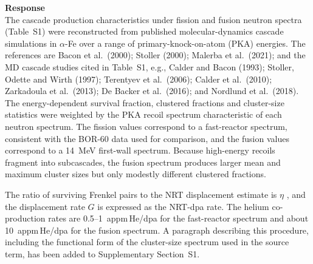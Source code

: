 \documentclass{article}
\newif\ifshowauthornotes
\newcommand{\authornote}[1]{\ifshowauthornotes{\color{red}\ [\textbf{Author action:} #1]}\fi}
\begin{document}
\begin{itemize}
\textbf{Response}\\
The cascade production characteristics under fission and fusion neutron spectra (Table~S1) were reconstructed from published molecular-dynamics cascade simulations in $\alpha$-Fe over a range of primary-knock-on-atom (PKA) energies. The references are Bacon et al.\ (2000); Stoller (2000); Malerba et al.\ (2021); and the MD cascade studies cited in Table~S1, e.g., Calder and Bacon (1993); Stoller, Odette and Wirth (1997); Terentyev et al.\ (2006); Calder et al.\ (2010); Zarkadoula et al.\ (2013); De Backer et al.\ (2016); and Nordlund et al.\ (2018). The energy-dependent survival fraction, clustered fractions and cluster-size statistics were weighted by the PKA recoil spectrum characteristic of each neutron spectrum. The fission values correspond to a fast-reactor spectrum, consistent with the BOR-60 data used for comparison, and the fusion values correspond to a 14~MeV first-wall spectrum. Because high-energy recoils fragment into subcascades, the fusion spectrum produces larger mean and maximum cluster sizes but only modestly different clustered fractions.

The ratio of surviving Frenkel pairs to the NRT displacement estimate is $\eta$ \authornote{insert value used, e.g., $\eta\approx 0.3$}, and the displacement rate $G$ is expressed as the NRT-dpa rate. The helium co-production rates are 0.5--1~appm\,He/dpa for the fast-reactor spectrum and about 10~appm\,He/dpa for the fusion spectrum. A paragraph describing this procedure, including the functional form of the cluster-size spectrum used in the source term, has been added to Supplementary Section~S1.

\authornote{Please confirm (a) whether ``replacement atom ratio'' refers to the survival efficiency $\eta$ relative to NRT (as assumed here) or to the replacement-collision fraction, (b) the PKA weighting actually used, and (c) the functional form of $G_n$ between $n=2$ and $i_{\rm cascade}$; then add the paragraph to S1. This also answers Reviewer \#4's comment on the source term.}
\end{itemize}
\end{document}
